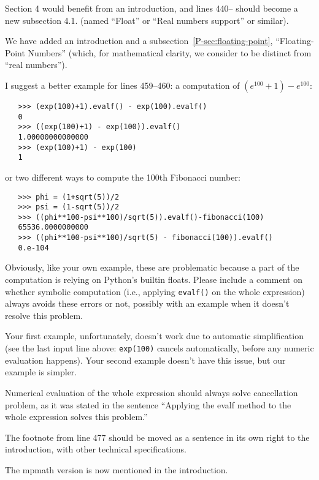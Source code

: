 \documentclass[answers,12pt]{exam}
\begin{document}
\begin{questions}
\question Section 4 would benefit from an introduction, and lines 440-- should become a new subsection 4.1. (named ``Float'' or ``Real numbers support'' or similar).
\begin{solution}
We have added an introduction and a subsection~\ref{P-sec:floating-point}, ``Floating-Point Numbers''
(which, for mathematical clarity, we consider to be distinct from ``real
numbers'').
\end{solution}

\question I suggest a better example for lines 459--460: a computation of
$(e^{100} +1) - e^{100}$:

\begin{verbatim}
   >>> (exp(100)+1).evalf() - exp(100).evalf()
   0
   >>> ((exp(100)+1) - exp(100)).evalf()
   1.00000000000000
   >>> (exp(100)+1) - exp(100)
   1
\end{verbatim}

or two different ways to compute the 100th Fibonacci number:

\begin{verbatim}
   >>> phi = (1+sqrt(5))/2
   >>> psi = (1-sqrt(5))/2
   >>> ((phi**100-psi**100)/sqrt(5)).evalf()-fibonacci(100)
   65536.0000000000
   >>> ((phi**100-psi**100)/sqrt(5) - fibonacci(100)).evalf()
   0.e-104
\end{verbatim}

Obviously, like your own example, these are problematic because a part of the computation is relying on Python's builtin floats. Please include a comment on whether symbolic computation (i.e., applying \texttt{evalf()} on the whole expression) always avoids these errors or not, possibly with an example when it doesn't resolve this problem.
\begin{solution}
  Your first example, unfortunately, doesn't work due to automatic
  simplification (see the last input line above:  \texttt{exp(100)} cancels
  automatically, before any numeric evaluation happens). Your second example
  doesn't have this issue, but our example is simpler.

Numerical evaluation of the whole expression should
always solve cancellation problem, as it was stated in the sentence
``Applying the evalf method to the whole expression solves this problem.''
\end{solution}

\question The footnote from line 477 should be moved as a sentence in its own right to the introduction, with other technical specifications.
\begin{solution}
The mpmath version is now mentioned in the introduction.
\end{solution}


\end{questions}
\end{document}
